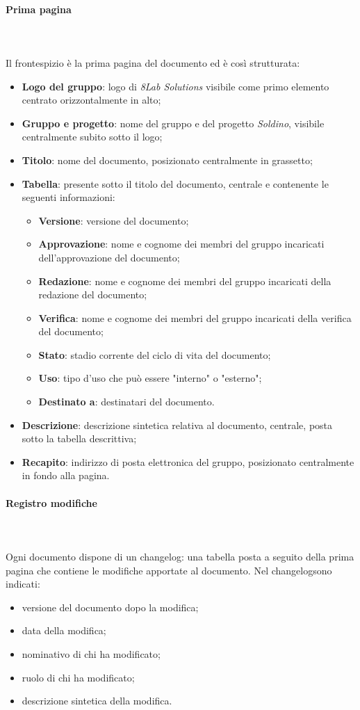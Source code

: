 		\paragraph{Prima pagina} \mbox{}\\ \mbox{}\\
		Il frontespizio è la prima pagina del documento ed è così strutturata:
		\begin{itemize}
			\item \textbf{Logo del gruppo}: logo di \textit{8Lab Solutions} visibile come primo elemento centrato orizzontalmente in alto;
			\item \textbf{Gruppo e progetto}: nome del gruppo e del progetto \textit{Soldino}, visibile centralmente subito sotto il logo;
			\item \textbf{Titolo}: nome del documento, posizionato centralmente in grassetto;
			\item \textbf{Tabella}: presente sotto il titolo del documento, centrale e contenente le seguenti informazioni:
			\begin{itemize}
				\item \textbf{Versione}: versione del documento;
				\item \textbf{Approvazione}: nome e cognome dei membri del gruppo incaricati dell'approvazione del documento;
				\item \textbf{Redazione}: nome e cognome dei membri del gruppo incaricati della redazione del documento;
				\item \textbf{Verifica}: nome e cognome dei membri del gruppo incaricati della verifica del documento;
				\item \textbf{Stato}: stadio corrente del ciclo di vita del documento;
				\item \textbf{Uso}: tipo d'uso che può essere "interno" o "esterno";
				\item \textbf{Destinato a}: destinatari del documento.
			\end{itemize}
			\item \textbf{Descrizione}: descrizione sintetica relativa al documento, centrale, posta sotto la tabella descrittiva;
			\item \textbf{Recapito}: indirizzo di posta elettronica del gruppo, posizionato centralmente in fondo alla pagina.
		\end{itemize}
		\paragraph{Registro modifiche} \mbox{}\\ \mbox{}\\
		Ogni documento dispone di un changelog\glo: una tabella posta a seguito della prima pagina che contiene le modifiche apportate al documento. Nel changelog\glo sono indicati:
		\begin{itemize}
			\item versione del documento dopo la modifica;
			\item data della modifica;
			\item nominativo di chi ha modificato;
			\item ruolo di chi ha modificato;
			\item descrizione sintetica della modifica.
		\end{itemize}
